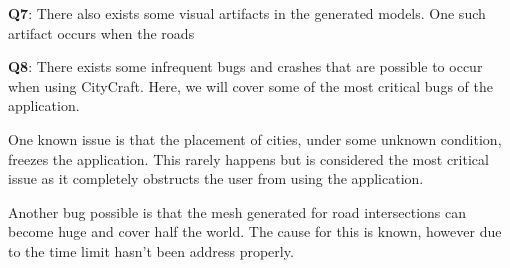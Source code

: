 \textbf{Q7}:
There also exists some visual artifacts in the generated models.
One such artifact occurs when the roads 


\textbf{Q8}:
There exists some infrequent bugs and crashes that are possible to occur when using CityCraft.
Here, we will cover some of the most critical bugs of the application.

One known issue is that the placement of cities, under some unknown condition, freezes the application.
This rarely happens but is considered the most critical issue as it completely obstructs the user from using the application.

Another bug possible is that the mesh generated for road intersections can become huge and cover half the world.
The cause for this is known, however due to the time limit hasn't been address properly.



